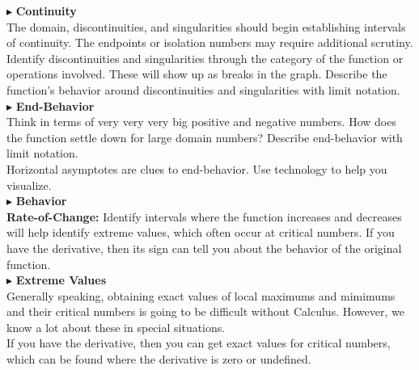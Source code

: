 \documentclass{ximera}
\begin{document}
$\blacktriangleright$ \textbf{\textcolor{red!10!blue!90!}{Continuity}} \\
The domain, discontinuities, and singularities should begin establishing intervals of continuity.  The endpoints or isolation numbers may require additional scrutiny.  \\


Identify discontinuities and singularities through the category of the function or operations involved.  These will show up as breaks in the graph. Describe the function's behavior around discontinuities and singularities with limit notation.\\








$\blacktriangleright$ \textbf{\textcolor{red!10!blue!90!}{End-Behavior}} \\
Think in terms of very very very big positive and negative numbers.  How does the function settle down for large domain numbers?  Describe end-behavior with limit notation. \\

Horizontal asymptotes are clues to end-behavior. Use technology to help you visualize.\\






$\blacktriangleright$ \textbf{\textcolor{red!10!blue!90!}{Behavior}} \\

\textbf{Rate-of-Change:} Identify intervals where the function increases and decreases will help identify extreme values, which often occur at critical numbers.  If you have the derivative, then its sign can tell you about the behavior of the original function.\\



$\blacktriangleright$ \textbf{\textcolor{red!10!blue!90!}{Extreme Values}} \\

Generally speaking, obtaining exact values of local maximums and mimimums and their critical numbers is going to be difficult without Calculus.  However, we know a lot about these in special situations. \\

If you have the derivative, then you can get exact values for critical numbers, which can be found where the derivative is zero or undefined. \\
\end{document}
